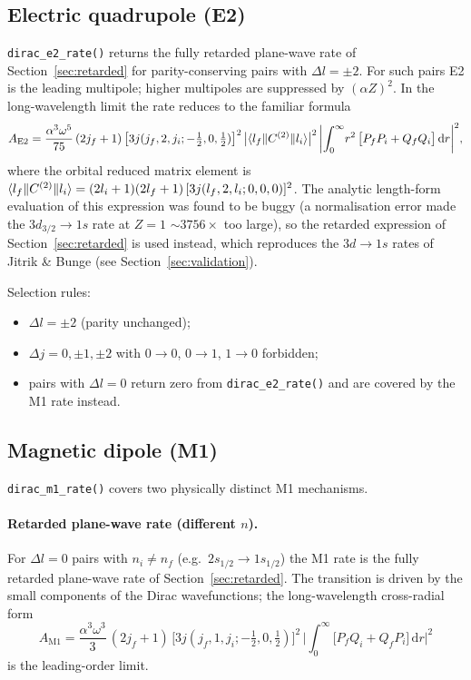 \documentclass[11pt,a4paper]{article}
\newcommand{\E}{\mathrm{E}}
\newcommand{\M}{\mathrm{M}}
\newcommand{\dif}{\mathrm{d}}
\begin{document}
\subsection{Electric quadrupole (E2)}

{\tt dirac\_e2\_rate()} returns the fully retarded plane-wave rate of
Section~\ref{sec:retarded} for parity-conserving pairs with
$\Delta l = \pm2$.  For such pairs E2 is the leading multipole; higher
multipoles are suppressed by $(\alpha Z)^{2}$.  In the long-wavelength
limit the rate reduces to the familiar formula
\begin{equation}
  A_{\E2} = \frac{\alpha^{3}\omega^{5}}{75}\,
    (2j_{f}+1)\,
    \bigl[3j(j_{f},2,j_{i};-\tfrac12,0,\tfrac12)\bigr]^{2}\,
    \bigl|\braket{l_{f}\|C^{(2)}\|l_{i}}\bigr|^{2}\,
    \biggl|\int_{0}^{\infty}\! r^{2}\,
      \bigl[P_{f}P_{i}+Q_{f}Q_{i}\bigr]\,\dif r\biggr|^{2},
  \label{eq:e2}
\end{equation}
where the orbital reduced matrix element is
$\braket{l_{f}\|C^{(2)}\|l_{i}} = (2l_{i}+1)(2l_{f}+1)\,
[3j(l_{f},2,l_{i};0,0,0)]^{2}$.  The analytic length-form evaluation of
this expression was found to be buggy (a normalisation error made the
$3d_{3/2}\to1s$ rate at $Z=1$ $\sim3756\times$ too large), so the
retarded expression of Section~\ref{sec:retarded} is used instead,
which reproduces the $3d\to1s$ rates of Jitrik \& Bunge
\cite{JitrikBunge2004} (see Section~\ref{sec:validation}).

Selection rules:
\begin{itemize}
  \item $\Delta l = \pm2$ (parity unchanged);
  \item $\Delta j = 0,\pm1,\pm2$ with $0\to0$, $0\to1$, $1\to0$ forbidden;
  \item pairs with $\Delta l = 0$ return zero from {\tt dirac\_e2\_rate()}
    and are covered by the M1 rate instead.
\end{itemize}

\subsection{Magnetic dipole (M1)}

{\tt dirac\_m1\_rate()} covers two physically distinct M1 mechanisms.

\paragraph{Retarded plane-wave rate (different $n$).}
For $\Delta l = 0$ pairs with $n_{i}\ne n_{f}$ (e.g.\
$2s_{1/2}\to1s_{1/2}$) the M1 rate is the fully retarded plane-wave rate
of Section~\ref{sec:retarded}.  The transition is driven by the small
components of the Dirac wavefunctions; the long-wavelength cross-radial
form
\begin{equation}
  A_{\M1} = \frac{\alpha^{3}\omega^{3}}{3}\,
    (2j_{f}+1)\,
    \bigl[3j(j_{f},1,j_{i};-\tfrac12,0,\tfrac12)\bigr]^{2}\,
    \biggl|\int_{0}^{\infty}\!
      \bigl[P_{f}Q_{i} + Q_{f}P_{i}\bigr]\,\dif r\biggr|^{2}
  \label{eq:m1}
\end{equation}
is the leading-order limit.  
\end{document}
